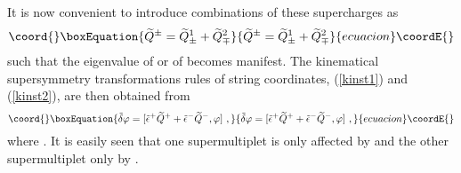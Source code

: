 \documentclass[a4paper,12pt]{article}
\begin{document}
It is now convenient to introduce combinations of these supercharges
as
\begin{equation}\coord{}\boxEquation{
\widetilde{Q}^\pm = \widetilde{Q}^1_\pm + \widetilde{Q}^2_\mp
}{
\widetilde{Q}^\pm = \widetilde{Q}^1_\pm + \widetilde{Q}^2_\mp
}{ecuacion}\coordE{}\end{equation}
such that the eigenvalue of \coordHE{} or of \coordHE{}
becomes manifest.  The kinematical supersymmetry transformations rules
of string coordinates, (\ref{kinst1}) and (\ref{kinst2}), are then
obtained from
\begin{equation}\coord{}\boxEquation{
\tilde{\delta} \varphi 
 = [ \tilde{\epsilon}^+ \widetilde{Q}^+
    +\tilde{\epsilon}^- \widetilde{Q}^- , \varphi ] ~,
}{
\tilde{\delta} \varphi 
 = [ \tilde{\epsilon}^+ \widetilde{Q}^+
    +\tilde{\epsilon}^- \widetilde{Q}^- , \varphi ] ~,
}{ecuacion}\coordE{}\end{equation}
where \coordHE{}.  It is easily seen that one \coordHE{}
supermultiplet \coordHE{} is only affected by
\coordHE{} and the other supermultiplet \coordHE{} only by \coordHE{}.
\end{document}
